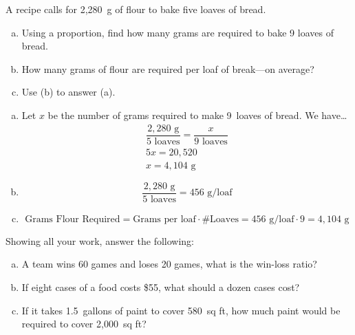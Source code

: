 \documentclass[11pt,letterpaper]{article}
\begin{document}

 A recipe calls for 2,280~g of flour to bake five loaves of bread. 
	\begin{enumerate}[(a)]
	\item Using a proportion, find how many grams are required to bake 9 loaves of bread.
	\item How many grams of flour are required per loaf of break---on average?
	\item Use (b) to answer (a). 
	\end{enumerate} \pspace

\sol 
\begin{enumerate}[(a)]
\item Let $x$ be the number of grams required to make 9~loaves of bread. We have\dots
	\[
	\begin{gathered}
	\dfrac{2,\!280 \text{ g}}{5 \text{ loaves}}= \dfrac{x}{9 \text{ loaves}} \\[0.3cm]
	5x= 20,\!520 \\[0.3cm]
	x= 4,\!104 \text{ g}
	\end{gathered}
	\] \pspace

\item 
	\[
	\dfrac{2,\!280 \text{ g}}{5 \text{ loaves}}= 456 \text{ g/loaf}
	\] \pspace

\item 
	\[
	\text{Grams Flour Required}= \text{Grams per loaf} \cdot \text{\# Loaves}= 456 \text{ g/loaf} \cdot 9= 4,\!104 \text{ g}
	\]
\end{enumerate}



\newpage



 Showing all your work, answer the following:
	\begin{enumerate}[(a)]
	\item A team wins 60 games and loses 20 games, what is the win-loss ratio?
	\item If eight cases of a food costs \$55, what should a dozen cases cost?
	\item If it takes 1.5~gallons of paint to cover 580~sq ft, how much paint would be required to cover 2,000~sq ft?
	\end{enumerate} \pspace
\end{document}
